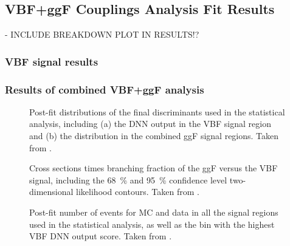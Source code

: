 
\subsection{\HWW VBF+ggF Couplings Analysis Fit Results}

- INCLUDE BREAKDOWN PLOT IN RESULTS!?


\subsubsection{VBF signal results}

\subsubsection{Results of combined VBF+ggF analysis}

\begin{figure}
    \caption{Post-fit distributions of the final discriminants used in the statistical analysis, including (a) the DNN output in the VBF signal region and (b) the \mT distribution in the combined ggF signal regions. Taken from .}
    \label{fig:post-fit-final-discriminatns}
\end{figure}

\begin{figure}
    \caption{Cross sections times branching fraction of the ggF versus the VBF signal, including the \SI{68}{\percent} and \SI{95}{\percent} confidence level two-dimensional likelihood contours. Taken from .}
    \label{fig:avocado-plot}
\end{figure}

\begin{figure}
    \caption{Post-fit number of events for MC and data in all the signal regions used in the statistical analysis, as well as the bin with the highest VBF DNN output score. Taken from .}
    \label{fig:post-fit-yields}
\end{figure}



